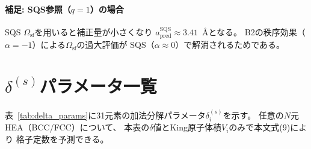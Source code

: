 \documentclass[5p,10pt]{elsarticle}
\begin{document}
\paragraph{補足: SQS参照（$q = 1$）の場合}
SQS $\Omega_\text{sf}$を用いると補正量が小さくなり
$a_\text{pred}^{\text{SQS}} \approx 3.41$~\AA{}となる。
B2の秩序効果（$\alpha = -1$）による$\Omega_\text{sf}$の過大評価が
SQS（$\alpha \approx 0$）で解消されるためである。


\section{$\delta^{(s)}$パラメータ一覧}
\label{sec:appendix_delta}

表~\ref{tab:delta_params}に31元素の加法分解パラメータ$\delta_i^{(s)}$を示す。
任意の$N$元HEA（BCC/FCC）について、
本表の$\delta$値とKing原子体積$V_i$のみで本文式(9)により
格子定数を予測できる。
\end{document}
